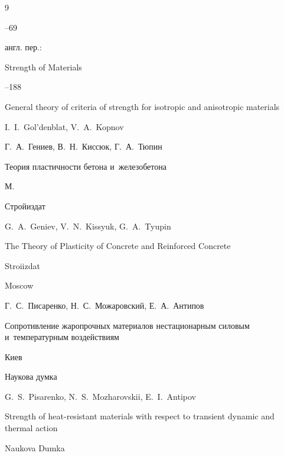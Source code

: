 \begin{thebibliography}{9}


--69

\transl англ. пер.:~

\jour Strength of Materials




--188

\paper General theory of criteria of strength for isotropic and anisotropic materials

\by I.~I.~Gol'denblat, V.~A.~Kopnov 






\by Г.~А.~Гениев, В.~Н.~Киссюк, Г.~А.~Тюпин 

\book Теория пластичности бетона и~железобетона 

\publaddr М. 

\publ Стройиздат 



\misctransl

\by G.~A.~Geniev, V.~N.~Kissyuk, G.~A.~Tyupin

\book The Theory of Plasticity of Concrete and Reinforced Concrete 

\publ Stroiizdat

\publaddr Moscow






\by Г.~С.~Писаренко, Н.~С.~Можаровский, Е.~А.~Антипов 

\book Сопротивление жаропрочных материалов нестационарным силовым и~температурным воздействиям

\publaddr Киев 

\publ Наукова думка 



\misctransl

\by G.~S.~Pisarenko, N.~S.~Mozharovskii, E.~I.~Antipov

\book Strength of heat-resistant materials with respect to transient dynamic and thermal action 

\publ Naukova Dumka


\end{thebibliography}
